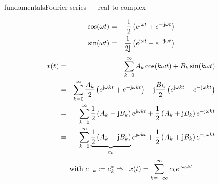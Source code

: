 \begin{frame}{fundamentals}{Fourier series --- real to complex}
    \vspace{-5mm}
    \begin{footnotesize}
    \begin{eqnarray}
        \cos(\omega t) &=& \frac{1}{2}\left(e^{\mathrm{j}\omega t} + e^{-\mathrm{j}\omega t}\right)\nonumber\\
        \sin(\omega t) &=& \frac{1}{2\mathrm{j}}\left(e^{\mathrm{j}\omega t} - e^{-\mathrm{j}\omega t}\right)\nonumber
    \end{eqnarray}
    \pause
    \vspace{-2mm}
    \begin{eqnarray}
        x(t) &=& \sum\limits_{k=0}^{\infty} A_k\cos(k\omega t) + B_k\sin(k\omega t)\nonumber\\
        &=& \sum\limits_{k=0}^{\infty} \frac{A_k}{2}\left(e^{\mathrm{j}\omega kt} + e^{-\mathrm{j}\omega kt}\right) - \mathrm{j}\frac{B_k}{2}\left(e^{\mathrm{j}\omega kt} - e^{-\mathrm{j}\omega kt}\right)\nonumber\\
        &=& \sum\limits_{k=0}^{\infty} \frac{1}{2}\left(A_k-\mathrm{j}B_k\right)e^{\mathrm{j}\omega kt} +  \frac{1}{2}\left(A_k+\mathrm{j}B_k\right)e^{-\mathrm{j}\omega kt}\nonumber\\
        &=& \sum\limits_{k=0}^{\infty} \underbrace{\frac{1}{2}\left(A_k-\mathrm{j}B_k\right)}_{c_k}e^{\mathrm{j}\omega kt} +  \frac{1}{2}\left(A_k+\mathrm{j}B_k\right)e^{-\mathrm{j}\omega kt}\nonumber
    \end{eqnarray}
    \begin{equation}\nonumber
       \text{with } c_{-k} := c^\ast_k \Rightarrow\;\; x(t) = \sum\limits_{k=-\infty}^{\infty} c_k e^{\mathrm{j}\omega_0kt}
    \end{equation}
    \end{footnotesize}
\end{frame}

